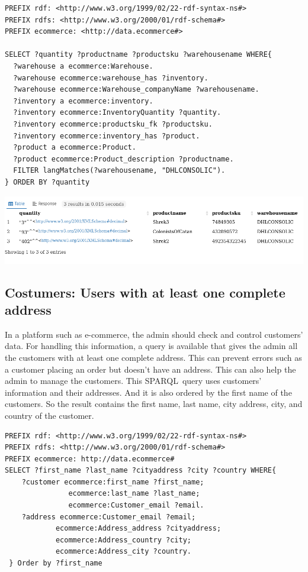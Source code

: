 \documentclass{article}
\begin{document}
\begin{lstlisting}[breaklines, frame=single]
PREFIX rdf: <http://www.w3.org/1999/02/22-rdf-syntax-ns#>
PREFIX rdfs: <http://www.w3.org/2000/01/rdf-schema#>
PREFIX ecommerce: <http://data.ecommerce#>

SELECT ?quantity ?productname ?productsku ?warehousename WHERE{
  ?warehouse a ecommerce:Warehouse.
  ?warehouse ecommerce:warehouse_has ?inventory.
  ?warehouse ecommerce:Warehouse_companyName ?warehousename.
  ?inventory a ecommerce:inventory.
  ?inventory ecommerce:InventoryQuantity ?quantity.
  ?inventory ecommerce:productsku_fk ?productsku.
  ?inventory ecommerce:inventory_has ?product.
  ?product a ecommerce:Product.
  ?product ecommerce:Product_description ?productname.
  FILTER langMatches(?warehousename, "DHLCONSOLIC").
} ORDER BY ?quantity
\end{lstlisting}

\begin{center}
   \includegraphics[scale=0.5]{OISreport-warehouse-query.png}
\end{center}



\subsection{Costumers: Users with at least one complete address}
In a platform such as e-commerce, the admin should check and control customers' data. For handling this information, a query is available that gives the admin all the customers with at least one complete address. This can prevent errors such as a customer placing an order but doesn't have an address. This can also help the admin to manage the customers. This SPARQL query uses customers' information and their addresses. And it is also ordered by the first name of the customers. So the result contains the first name, last name, city address, city, and country of the customer.

\begin{lstlisting}[breaklines, frame=single]
PREFIX rdf: <http://www.w3.org/1999/02/22-rdf-syntax-ns#>
PREFIX rdfs: <http://www.w3.org/2000/01/rdf-schema#>
PREFIX ecommerce: http://data.ecommerce#
SELECT ?first_name ?last_name ?cityaddress ?city ?country WHERE{
	?customer ecommerce:first_name ?first_name;
			   ecommerce:last_name ?last_name;
			   ecommerce:Customer_email ?email.
	?address ecommerce:Customer_email ?email;
			ecommerce:Address_address ?cityaddress;
			ecommerce:Address_country ?city;
			ecommerce:Address_city ?country.
 } Order by ?first_name
\end{lstlisting}
\end{document}
